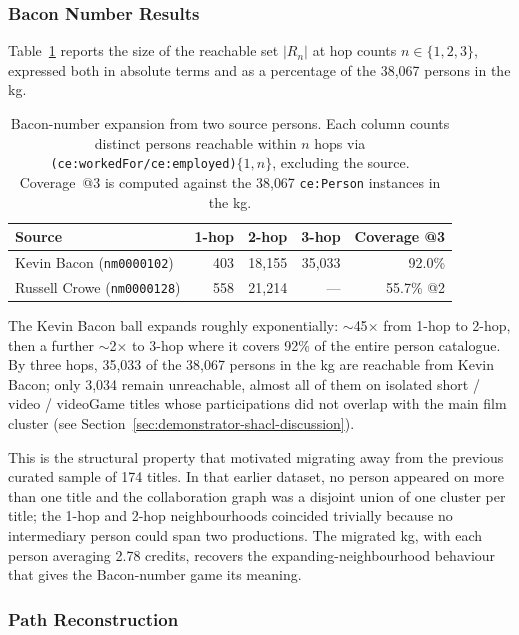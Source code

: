 \subsubsection{Bacon Number Results}

Table~\ref{tab:bacon-counts} reports the size of the reachable set $|R_n|$ at hop counts $n \in \{1, 2, 3\}$, expressed both in absolute terms and as a percentage of the 38{,}067 persons in the \ac{kg}.

\begin{table}[H]
\centering
\small
\begin{tabular}{lrrrr}
\hline
\textbf{Source} & \textbf{1-hop} & \textbf{2-hop} & \textbf{3-hop} & \textbf{Coverage @3} \\
\hline
Kevin Bacon (\texttt{nm0000102}) & 403 & 18{,}155 & 35{,}033 & 92.0\% \\
Russell Crowe (\texttt{nm0000128}) & 558 & 21{,}214 & ---      & 55.7\% @2 \\
\hline
\end{tabular}
\caption{Bacon-number expansion from two source persons. Each column counts distinct persons reachable within $n$ hops via \texttt{(ce:workedFor/ce:employed)$\{1,n\}$}, excluding the source. Coverage~@3 is computed against the 38{,}067 \texttt{ce:Person} instances in the \ac{kg}.}
\label{tab:bacon-counts}
\end{table}

The Kevin Bacon ball expands roughly exponentially: $\sim$45$\times$ from 1-hop to 2-hop, then a further $\sim$2$\times$ to 3-hop where it covers 92\% of the entire person catalogue. By three hops, 35{,}033 of the 38{,}067 persons in the \ac{kg} are reachable from Kevin Bacon; only 3{,}034 remain unreachable, almost all of them on isolated short / video / videoGame titles whose participations did not overlap with the main film cluster (see Section~\ref{sec:demonstrator-shacl-discussion}).

This is the structural property that motivated migrating away from the previous curated sample of 174 titles. In that earlier dataset, no person appeared on more than one title and the collaboration graph was a disjoint union of one cluster per title; the 1-hop and 2-hop neighbourhoods coincided trivially because no intermediary person could span two productions. The migrated \ac{kg}, with each person averaging 2.78 credits, recovers the expanding-neighbourhood behaviour that gives the Bacon-number game its meaning.

\subsubsection{Path Reconstruction}

